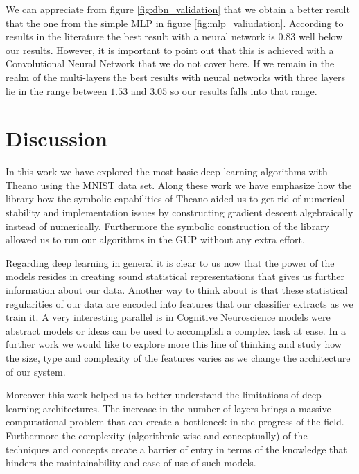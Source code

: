 \documentclass[11pt,a4paper]{article}
\begin{document}
	
We can appreciate from figure \ref{fig:dbn_validation} that we obtain a better result that the one from the simple MLP in figure \ref{fig:mlp_valiudation}. According to results in the literature \citep{lecun1998mnist} the best result with a neural network is $0.83$ well below our results. However, it is important to point out that this is achieved with a Convolutional Neural Network that we do not cover here. If we remain in the realm of the multi-layers the best results with neural networks with three layers lie in the range between $1.53$ and $3.05$ so our results falls into that range. 


\section{Discussion}

In this work we have explored the most basic deep learning algorithms with Theano using the MNIST data set. Along these work we have emphasize how the library how the symbolic capabilities of Theano aided us to get rid of numerical stability and implementation issues by constructing gradient descent algebraically instead of numerically. Furthermore the symbolic construction of the library allowed us to run our algorithms in the GUP without any extra effort. 


Regarding deep learning in general it is clear to us now that the power of the models resides in creating sound statistical representations that gives us further information about our data. Another way to think about is that these statistical regularities of our data are encoded into features that our classifier extracts as we train it. A very interesting parallel is in Cognitive Neuroscience models were abstract models or ideas can be used to accomplish a complex task at ease. In a further work we would like to explore more this line of thinking and study how the size, type and complexity of the features varies as we change the architecture of our system. 

Moreover this work helped us to better understand the limitations of deep learning architectures. The increase in the number of layers brings a massive computational problem that can create a bottleneck in the progress of the field. Furthermore the complexity (algorithmic-wise and conceptually) of the techniques and concepts create a barrier of entry in terms of the knowledge that hinders the maintainability and ease of use of such models. 
\end{document}
